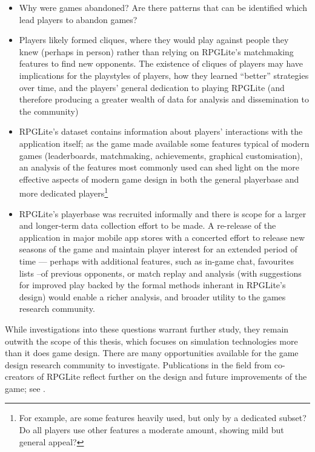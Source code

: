 \begin{itemize}
    \item Why were games abandoned? Are there patterns that can be identified
    which lead players to abandon games?
    \item Players likely formed cliques, where they would play against people
    they knew (perhaps in person) rather than relying on RPGLite's matchmaking
    features to find new opponents. The existence of cliques of players may have
    implications for the playstyles of players, how they learned ``better''
    strategies over time, and the players' general dedication to playing RPGLite
    (and therefore producing a greater wealth of data for analysis and
    dissemination to the community)
    \item RPGLite's dataset contains information about players' interactions
    with the application itself; as the game made available some features
    typical of modern games (leaderboards, matchmaking, achievements, graphical
    customisation), an analysis of the features most commonly used can shed
    light on the more effective aspects of modern game design in both the
    general playerbase and more dedicated players\footnote{For example, are some
    features heavily used, but only by a dedicated subset? Do all players use
    other features a moderate amount, showing mild but general appeal?}
    \item RPGLite's playerbase was recruited informally and there is scope for a
    larger and longer-term data collection effort to be made. A re-release of
    the application in major mobile app stores with a concerted effort to
    release new seasons of the game and maintain player interest for an extended
    period of time
    --- perhaps with additional features, such as in-game chat, favourites lists
    --of
    previous opponents, or match replay and analysis (with suggestions for
    improved play backed by the formal methods inherant in RPGLite's design)
    would enable a richer analysis, and broader utility to the games research
    community.
\end{itemize}

While investigations into these questions warrant further study, they remain
outwith the scope of this thesis, which focuses on simulation technologies more
than it does game design. There are many opportunities available for the game
design research community to investigate. Publications in the field from
co-creators of RPGLite reflect further on the design and future improvements of
the game; see .


